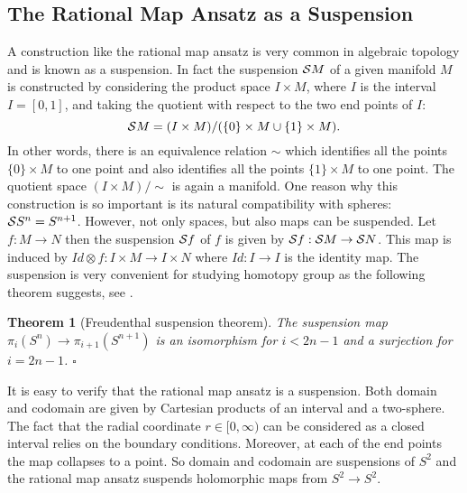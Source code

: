 \documentclass[a4paper,12pt]{article}
\newtheorem {theorem}{Theorem}[section]
\begin{document}
\subsection{The Rational Map Ansatz as a Suspension}
\label{Suspension}

A construction like the rational map ansatz is very common in
algebraic topology and is known as a suspension. In fact the
suspension ${\cal S} M$  of a given manifold $M$ is constructed by
considering the product space  $I \times M$, where $I$ is the interval
$I=[0,1]$, and taking the quotient with respect  to the two end points
of $I$: 
%
\begin{equation}
{\cal S} M = (I \times M) / (\{0\} \times M \cup \{1\} \times M).
\end{equation}
%
In other words, there is an equivalence relation $\sim$ which identifies 
all the points $\{0\} \times M$ to one point and also identifies all the 
points $\{1\} \times M$ to one point. 
The quotient space $(I \times M)/\sim$ is again a manifold.
One reason why this construction is so important is its 
natural compatibility with spheres:  ${\cal S} S^n = S^{n+1}$.  However, not
only spaces, but also maps can be suspended. Let $f: M \to N$ then the
suspension ${\cal S} f$ of $f$ is given by  ${\cal S} f: {\cal S} M
\to {\cal S} N$. This map is induced by $Id \otimes f: I \times M \to I \times 
N$ where $Id: I \to I$ is the identity map.
The suspension is very convenient for studying homotopy 
group as the following theorem suggests, see 
\cite[Corollary 4.24]{Hatcher:2002}.
%
\begin{theorem}[Freudenthal suspension theorem]
\label{t:suspension}
The suspension map 
\linebreak[4]
\mbox{$\pi_i(S^n) \to \pi_{i+1}(S^{n+1})$} is an
isomorphism for $i < 2n-1$ and a surjection for $i= 2n - 1$. \hfill 
$\square$
\end{theorem}
%
It is easy to verify that the rational map ansatz is a suspension. 
Both domain and codomain are given by Cartesian 
products of an interval and a two-sphere. The fact that the radial 
coordinate $r \in [0,\infty)$ can be considered as a closed interval 
relies on the boundary conditions. Moreover, at each of the end 
points the map collapses to a point. So domain and codomain are 
suspensions of $S^2$ and the rational map ansatz suspends holomorphic maps 
from $S^2 \to S^2$.  
\end{document}
